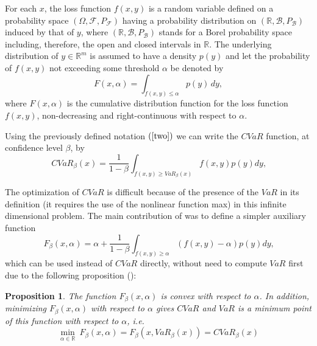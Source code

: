 \documentclass[a4paper,12pt]{report}
\newtheorem{proposition}{Proposition}
\begin{document}
\bigskip

For each $x$, the loss function $f\left( x,y\right) $ is a random variable
defined on a probability space $\left( \Omega ,\mathcal{F},P_{\mathcal{F}%
}\right) $ having a probability distribution on $\left(
\mathbb{R}
,\mathcal{B},P_{\mathcal{B}}\right) $ induced by that of $y$, where $\left(
\mathbb{R}
,\mathcal{B},P_{\mathcal{B}}\right) $ stands for a Borel probability space
including, therefore, the open and closed intervals in $%
\mathbb{R}
$. The underlying distribution of $y\in
\mathbb{R}
^{m}$ is assumed to have a density $p(y)$ and let the probability of $f\left( x,y\right) $ not exceeding some threshold $\alpha$ be denoted by
\begin{equation}
F(x,\alpha)=\int_{f(x,y)\leq \alpha}p(y)\,dy,  \label{four}
\end{equation}
where $F(x,\alpha)$ is the cumulative distribution function for the loss function $f\left( x,y\right) $, non-decreasing and right-continuous with respect to $\alpha$.

Using the previously defined notation $\left( \ref{two}\right) $ we can
write the $CVaR$ function, at confidence level $\beta $, by%
\begin{equation}
CVaR_{\beta }\left( x\right) = \frac{1}{1-\beta }\int_{f(x,y)\geq VaR_{\beta
	}\left( x\right) }f(x,y)p(y)dy\text{,}  \label{five}
\end{equation}

The optimization of $CVaR$ is difficult because of the presence of the $VaR$
in its definition (it requires the use of the nonlinear function max) in
this infinite dimensional problem. The main contribution of \citet*{%
	rockafellar2000} was to define a simpler auxiliary function
\begin{equation}
F_{\beta }\left( x,\alpha \right) = \alpha +\frac{1}{1-\beta }%
\int_{f(x,y)\geq \alpha }\left( f(x,y)-\alpha \right) p(y)dy\text{,}
\label{six}
\end{equation}%
which can be used instead of $CVaR$ directly, without need to compute $VaR$
first due to the following proposition (\citet*{pflug2000}): \bigskip

\begin{proposition}
	The function $F_{\beta }\left( x,\alpha \right) $ is convex with respect to $%
	\alpha $. In addition, minimizing $F_{\beta }\left( x,\alpha \right) $ with
	respect to $\alpha $ gives $CVaR$ and $VaR$ is a minimum point of this
	function with respect to $\alpha $, i.e.
	\begin{equation}
	\underset{\alpha \in
		\mathbb{R}
	}{\min }~F_{\beta }\left( x,\alpha \right) =F_{\beta }\left( x,VaR_{\beta
	}\left( x\right) \right) =CVaR_{\beta }(x)  \label{seven}
	\end{equation}
\end{proposition}
\end{document}
